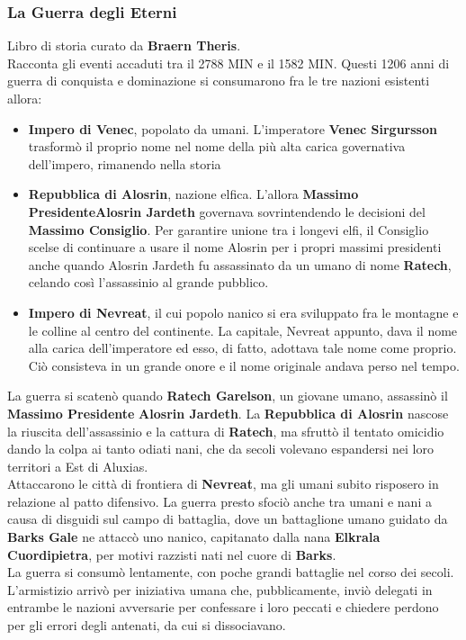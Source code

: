 \documentclass[10pt,twoside,onecolumn,openany]{book}
\begin{document}
\subsubsection{La Guerra degli Eterni}
Libro di storia curato da \textbf{Braern Theris}.\\
Racconta gli eventi accaduti tra il 2788 MIN e il 1582 MIN. Questi 1206 anni di guerra di conquista e dominazione si consumarono fra le tre nazioni esistenti allora:\\
\begin{itemize}
\item  \textbf{Impero di Venec}, popolato da umani. L'imperatore \textbf{Venec Sirgursson} trasformò il proprio nome nel nome della più alta carica governativa dell'impero, rimanendo nella storia
\item \textbf{Repubblica di Alosrin}, nazione elfica. L'allora \textbf{Massimo Presidente}\textbf{Alosrin Jardeth} governava sovrintendendo le decisioni del \textbf{Massimo Consiglio}. Per garantire unione tra i longevi elfi, il Consiglio scelse di continuare a usare il nome Alosrin per i propri massimi presidenti anche quando Alosrin Jardeth fu assassinato da un umano di nome \textbf{Ratech}, celando così l'assassinio al grande pubblico.
\item \textbf{Impero di Nevreat}, il cui popolo nanico si era sviluppato fra le montagne e le colline al centro del continente. La capitale, Nevreat appunto, dava il nome alla carica dell'imperatore ed esso, di fatto, adottava tale nome come proprio. Ciò consisteva in un grande onore e il nome originale andava perso nel tempo.
\end{itemize}
La guerra si scatenò quando \textbf{Ratech Garelson}, un giovane umano, assassinò il \textbf{Massimo Presidente} \textbf{Alosrin Jardeth}. La \textbf{Repubblica di Alosrin} nascose la riuscita dell'assassinio e la cattura di \textbf{Ratech}, ma sfruttò il tentato omicidio dando la colpa ai tanto odiati nani, che da secoli volevano espandersi nei loro territori a Est di Aluxias.\\
Attaccarono le città di frontiera di \textbf{Nevreat}, ma gli umani subito risposero in relazione al patto difensivo. La guerra presto sfociò anche tra umani e nani a causa di disguidi sul campo di battaglia, dove un battaglione umano guidato da \textbf{Barks Gale} ne attaccò uno nanico, capitanato dalla nana \textbf{Elkrala Cuordipietra}, per motivi razzisti nati nel cuore di \textbf{Barks}.\\
La guerra si consumò lentamente, con poche grandi battaglie nel corso dei secoli. L'armistizio arrivò per iniziativa umana che, pubblicamente, inviò delegati in entrambe le nazioni avversarie per confessare i loro peccati e chiedere perdono per gli errori degli antenati, da cui si dissociavano.\\
\end{document}
